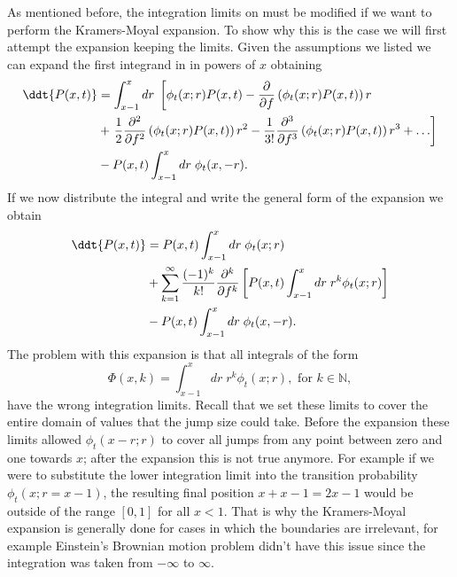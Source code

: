 As mentioned before, the integration limits on  must be
modified if we want to perform the Kramers-Moyal expansion. To show why this is
the case we will first attempt the expansion keeping the limits. Given the
assumptions we listed we can expand the first integrand in
 in powers of $x$ obtaining
\begin{equation}
  \begin{split}
    \ddt{P(x, t)} &= \int^x_{x - 1} dr \;
    \left[
    \phi_t(x; r) P(x, t) -
    {\partial \over \partial f} \left( \phi_t(x; r) P(x, t) \right) r \right. \\
    &+ \left.
    {1 \over 2} {\partial^2 \over \partial f^2}
    \left( \phi_t(x; r) P(x, t) \right) r^2 -
    {1 \over 3!} {\partial^3 \over \partial f^3}
    \left( \phi_t(x; r) P(x, t) \right) r^3 + \ldots
    \right] \\
    &-
    P(x, t) \int_{x - 1}^x dr \; \phi_t(x, -r).
  \end{split}
\end{equation}
If we now distribute the integral and write the general form of the expansion
we obtain
\begin{equation}
  \begin{split}
    \ddt{P(x, t)} &= P(x, t)\int^x_{x - 1} dr \; \phi_t(x; r) \\
    &+
    \sum_{k=1}^\infty {(-1)^k \over k!} {\partial^k \over \partial f^k}
    \left[
    P(x, t) \int_{x-1}^x dr \; r^k \phi_t(x; r)
    \right] \\
    &-
    P(x, t) \int_{x - 1}^x dr \; \phi_t(x, -r).
  \end{split}
\end{equation}
The problem with this expansion is that all integrals of the form
\begin{equation}
  \Phi(x, k) = \int_{x-1}^x dr \; r^k \phi_t(x; r),
  \text{ for } k \in \mathbb{N},
\end{equation}
have the wrong integration limits. Recall that we set these limits to cover the
entire domain of values that the jump size could take. Before the expansion
these limits allowed $\phi_t(x - r; r)$ to cover all jumps from any point
between zero and one towards $x$; after the expansion this is not true anymore.
For example if we were to substitute the lower integration limit into the
transition probability $\phi_t(x; r = x-1)$, the resulting final position $x +
x -1 = 2x -1$ would be outside of the range $[0, 1]$ for all $x < 1$. That is
why the Kramers-Moyal expansion is generally done for cases in which the
boundaries are irrelevant, for example Einstein's Brownian motion problem
didn't have this issue since the integration was taken from $-\infty$ to
$\infty$.

